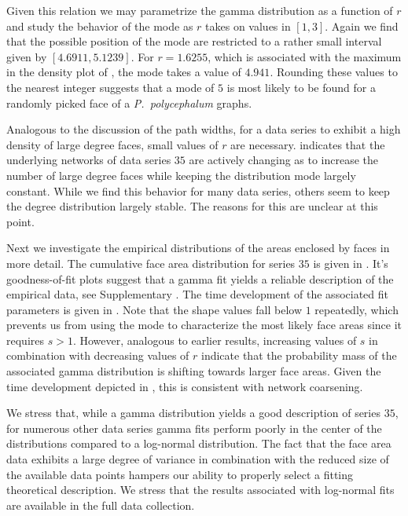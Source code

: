 		Given this relation we may parametrize the gamma distribution as a function of $r$ and study the behavior of the mode as $r$ takes on values in $[1,3]$. Again we find that the possible position of the mode are restricted to a rather small interval given by $[4.6911,5.1239]$. For $r = 1.6255$, which is associated with the maximum in the density plot of , the mode takes a value of $4.941$. Rounding these values to the nearest integer suggests that a mode of $5$ is most likely to be found for a randomly picked face of a \emph{P.~polycephalum} graphs.

		Analogous to the discussion of the path widths, for a data series to exhibit a high density of large degree faces, small values of $r$ are necessary.  indicates that the underlying networks of data series $35$ are actively changing as to increase the number of large degree faces while keeping the distribution mode largely constant. While we find this behavior for many data series, others seem to keep the degree distribution largely stable. The reasons for this are unclear at this point.


		Next we investigate the empirical distributions of the areas enclosed by faces in more detail. The cumulative face area distribution for series $35$ is given in . It's goodness-of-fit plots suggest that a gamma fit yields a reliable description of the empirical data, see Supplementary . The time development of the associated fit parameters is given in . Note that the shape values fall below $1$ repeatedly, which prevents us from using the mode to characterize the most likely face areas since it requires $s >1$. However, analogous to earlier results, increasing values of $s$ in combination with decreasing values of $r$ indicate that the probability mass of the associated gamma distribution is shifting towards larger face areas. Given the time development depicted in , this is consistent with network coarsening.

		We stress that, while a gamma distribution yields a good description of series $35$, for numerous other data series gamma fits perform poorly in the center of the distributions compared to a log-normal distribution. The fact that the face area data exhibits a large degree of variance in combination with the reduced size of the available data points hampers our ability to properly select a fitting theoretical description. We stress that the results associated with log-normal fits are available in the full data collection.

